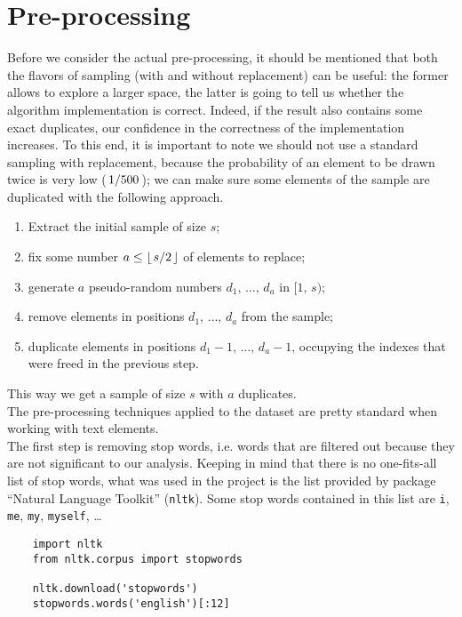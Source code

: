 \documentclass{article}
\begin{document}
  \section{Pre-processing}
  Before we consider the actual pre-processing, it should be mentioned that
  both the flavors of sampling (with and without replacement) can be useful:
  the former allows to explore a larger space, the latter is going to tell us
  whether the algorithm implementation is correct. Indeed, if the result also
  contains some exact duplicates, our confidence in the correctness of the
  implementation increases. To this end, it is important to note we should not
  use a standard sampling with replacement, because the probability of an
  element to be drawn twice is very low (\( \slashfrac{ 1 }{ 500 } \)); we can
  make sure some elements of the sample are duplicated with the following
  approach.
  \begin{enumerate}
    \item Extract the initial sample of size \( s \);
    \item fix some number \( a \leq \lfloor \slashfrac s 2 \rfloor \) of
    elements to replace;
    \item generate \( a \) pseudo-random numbers \( d_1, \, \dots, \, d_a \) in
    \( [ 1, \, s ) \);
    \item remove elements in positions \( d_1, \, \dots, \, d_a \) from the
    sample;
    \item duplicate elements in positions \( d_1 - 1, \, \dots, \, d_a - 1 \),
    occupying the indexes that were freed in the previous step.
  \end{enumerate}
  This way we get a sample of size \( s \) with \( a \) duplicates. \\
  The pre-processing techniques applied to the dataset are pretty standard when
  working with text elements. \\
  The first step is removing stop words, i.e. words that are filtered out
  because they are not significant to our analysis. Keeping in mind that there
  is no one-fits-all list of stop words, what was used in the project is the
  list provided by package “Natural Language Toolkit” (\texttt{nltk}). Some
  stop words contained in this list are \texttt i, \texttt{me}, \texttt{my},
  \texttt{myself}, \dots \\
  \begin{verbatim}
    import nltk
    from nltk.corpus import stopwords

    nltk.download('stopwords')
    stopwords.words('english')[:12]
  \end{verbatim}
\end{document}
